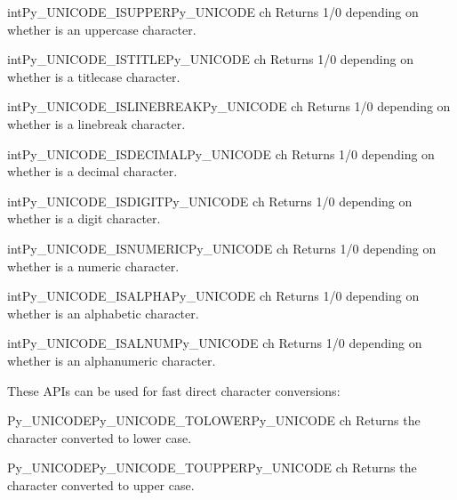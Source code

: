 \documentclass{manual}
\begin{document}
\begin{cfuncdesc}{int}{Py_UNICODE_ISUPPER}{Py_UNICODE ch}
Returns 1/0 depending on whether  is an uppercase character.
\end{cfuncdesc}

\begin{cfuncdesc}{int}{Py_UNICODE_ISTITLE}{Py_UNICODE ch}
Returns 1/0 depending on whether  is a titlecase character.
\end{cfuncdesc}

\begin{cfuncdesc}{int}{Py_UNICODE_ISLINEBREAK}{Py_UNICODE ch}
Returns 1/0 depending on whether  is a linebreak character.
\end{cfuncdesc}

\begin{cfuncdesc}{int}{Py_UNICODE_ISDECIMAL}{Py_UNICODE ch}
Returns 1/0 depending on whether  is a decimal character.
\end{cfuncdesc}

\begin{cfuncdesc}{int}{Py_UNICODE_ISDIGIT}{Py_UNICODE ch}
Returns 1/0 depending on whether  is a digit character.
\end{cfuncdesc}

\begin{cfuncdesc}{int}{Py_UNICODE_ISNUMERIC}{Py_UNICODE ch}
Returns 1/0 depending on whether  is a numeric character.
\end{cfuncdesc}

\begin{cfuncdesc}{int}{Py_UNICODE_ISALPHA}{Py_UNICODE ch}
Returns 1/0 depending on whether  is an alphabetic character.
\end{cfuncdesc}

\begin{cfuncdesc}{int}{Py_UNICODE_ISALNUM}{Py_UNICODE ch}
Returns 1/0 depending on whether  is an alphanumeric character.
\end{cfuncdesc}

These APIs can be used for fast direct character conversions:

\begin{cfuncdesc}{Py_UNICODE}{Py_UNICODE_TOLOWER}{Py_UNICODE ch}
Returns the character  converted to lower case.
\end{cfuncdesc}

\begin{cfuncdesc}{Py_UNICODE}{Py_UNICODE_TOUPPER}{Py_UNICODE ch}
Returns the character  converted to upper case.
\end{cfuncdesc}
\end{document}
